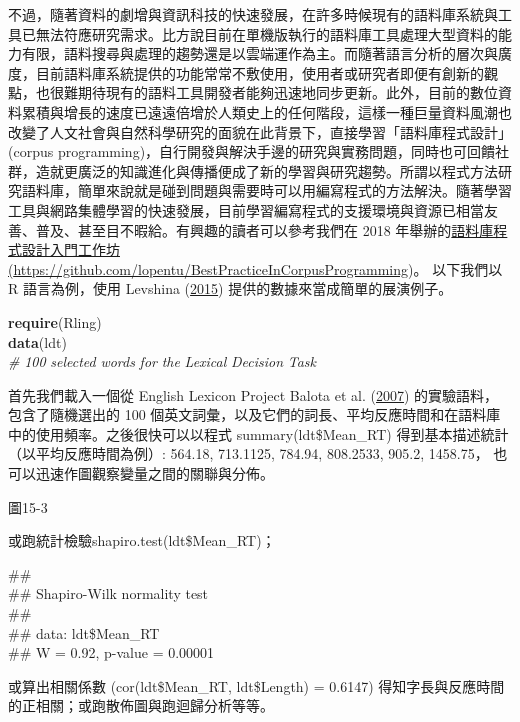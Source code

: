 不過，隨著資料的劇增與資訊科技的快速發展，在許多時候現有的語料庫系統與工具已無法符應研究需求。比方說目前在單機版執行的語料庫工具處理大型資料的能力有限，語料搜尋與處理的趨勢還是以雲端運作為主。而隨著語言分析的層次與廣度，目前語料庫系統提供的功能常常不敷使用，使用者或研究者即便有創新的觀點，也很難期待現有的語料工具開發者能夠迅速地同步更新。此外，目前的數位資料累積與增長的速度已遠遠倍增於人類史上的任何階段，這樣一種巨量資料風潮也改變了人文社會與自然科學研究的面貌在此背景下，直接學習「語料庫程式設計」(corpus programming)，自行開發與解決手邊的研究與實務問題，同時也可回饋社群，造就更廣泛的知識進化與傳播便成了新的學習與研究趨勢。所謂以程式方法研究語料庫，簡單來說就是碰到問題與需要時可以用編寫程式的方法解決。隨著學習工具與網路集體學習的快速發展，目前學習編寫程式的支援環境與資源已相當友善、普及、甚至目不暇給。有興趣的讀者可以參考我們在 2018 年舉辦的\href{https://github.com/lopentu/BestPracticeInCorpusProgramming}{語料庫程式設計入門工作坊}\href{https://github.com/lopentu/BestPracticeInCorpusProgramming}{(}\url{https://github.com/lopentu/BestPracticeInCorpusProgramming})。 以下我們以 R 語言為例，使用 Levshina (\hyperlink{bookmarkid3tbugp1}{2015}) 提供的數據來當成簡單的展演例子。

\textbf{require}(Rling)\\
\textbf{data}(ldt)\\
\textit{\#} \textit{100} \textit{selected} \textit{words} \textit{for} \textit{the} \textit{Lexical} \textit{Decision} \textit{Task}

首先我們載入一個從 English Lexicon Project Balota et al. (\hyperlink{bookmarkid32hioqz}{2007}) 的實驗語料，包含了隨機選出的 100 個英文詞彙，以及它們的詞長、平均反應時間和在語料庫中的使用頻率。之後很快可以以程式 summary(ldt\$Mean\_RT) 得到基本描述統計（以平均反應時間為例）: 564.18, 713.1125, 784.94, 808.2533, 905.2, 1458.75， 也可以迅速作圖觀察變量之間的關聯與分佈。

  
 

圖15-3

或跑統計檢驗shapiro.test(ldt\$Mean\_RT)；

\#\# \\
\#\#  Shapiro-Wilk normality test\\
\#\# \\
\#\# data:  ldt\$Mean\_RT\\
\#\# W = 0.92, p-value = 0.00001

或算出相關係數 (cor(ldt\$Mean\_RT, ldt\$Length) = 0.6147) 得知字長與反應時間的正相關；或跑散佈圖與跑迴歸分析等等。

